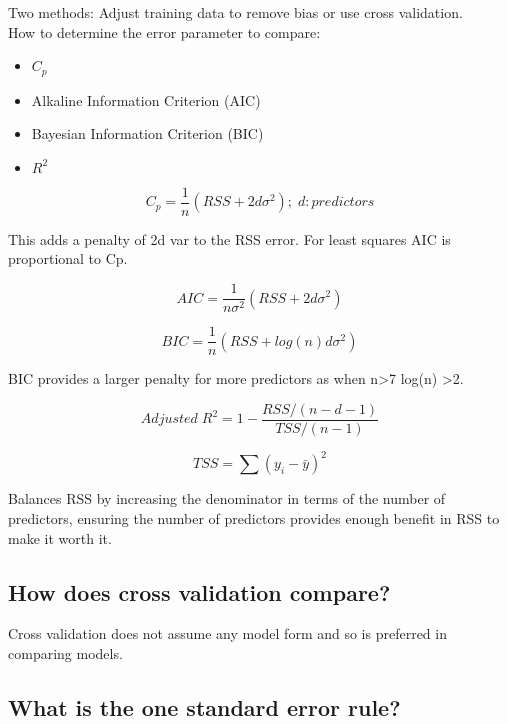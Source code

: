 \documentclass[11pt]{scrartcl} %
\begin{document}
Two methods: Adjust training data to remove bias or use cross validation.\\

How to determine the error parameter to compare:

\begin{itemize}
	\item \(C_p\)
	\item Alkaline Information Criterion (AIC)
	\item Bayesian Information Criterion (BIC)
	\item \(R^2\)
\end{itemize}

\begin{equation}
	C_p = \frac{1}{n}(RSS+2d\sigma^2);\; d:predictors
\end{equation}

This adds a penalty of 2d var to the RSS error. For least squares AIC is proportional to Cp.

\begin{equation}
	AIC = \frac{1}{n\sigma^2}(RSS+2d\sigma^2)
\end{equation}

\begin{equation}
	BIC = \frac{1}{n}(RSS + log(n)d\sigma^2)
\end{equation}

BIC provides a larger penalty for more predictors as when n>7 log(n) >2.

\begin{equation}
	Adjusted\; R^2 = 1 - \frac{RSS/(n-d-1)}{TSS/(n-1)}
\end{equation}

\begin{equation}
	TSS = \sum{(y_i - \bar{y})^2}
\end{equation}

Balances RSS by increasing the denominator in terms of the number of predictors, ensuring
the number of predictors provides enough benefit in RSS to make it worth it.

\subsection{How does cross validation compare?}

Cross validation does not assume any model form and so is preferred in comparing models.

\subsection{What is the one standard error rule?}
\end{document}
